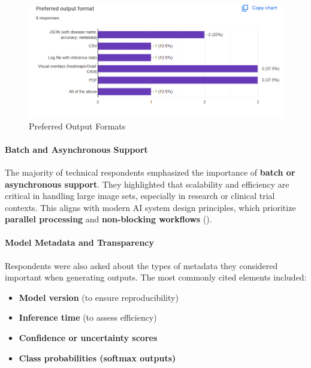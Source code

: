 \documentclass[
  12pt,
  oneside]{article}
\providecommand{\tightlist}{%
  \setlength{\itemsep}{0pt}\setlength{\parskip}{0pt}}
\begin{document}
\begin{figure}

{\centering \includegraphics[width=1\linewidth]{technical-user-chart6} 

}

\caption{Preferred Output Formats}\label{fig:unnamed-chunk-13}
\end{figure}

\paragraph{Batch and Asynchronous
Support}\label{batch-and-asynchronous-support}

The majority of technical respondents emphasized the importance of
\textbf{batch or asynchronous support}. They highlighted that
scalability and efficiency are critical in handling large image sets,
especially in research or clinical trial contexts. This aligns with
modern AI system design principles, which prioritize \textbf{parallel
processing} and \textbf{non-blocking workflows}
().

\paragraph{Model Metadata and
Transparency}\label{model-metadata-and-transparency}

Respondents were also asked about the types of metadata they considered
important when generating outputs. The most commonly cited elements
included:

\begin{itemize}
\tightlist
\item
  \textbf{Model version} (to ensure reproducibility)
\item
  \textbf{Inference time} (to assess efficiency)
\item
  \textbf{Confidence or uncertainty scores}
\item
  \textbf{Class probabilities (softmax outputs)}
\end{itemize}
\end{document}
